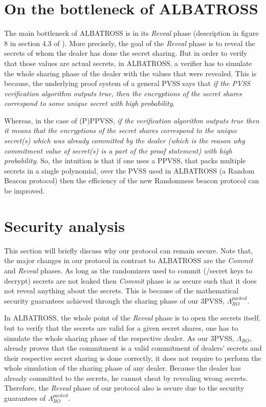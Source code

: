 \section{On the bottleneck of ALBATROSS}
The main bottleneck of ALBATROSS is in its \textit{Reveal} phase (description in 
figure 8 in section 4.3 of \cite{cryptoeprint:2020/644}). More precisely, the 
goal of the \textit{Reveal} phase is to reveal the secrets of whom the dealer has done the 
secret sharing. But in order to verify that those values are actual secrets, in ALBATROSS, a 
verifier has to simulate the whole sharing phase of the dealer with the values that were 
revealed. This is because, the underlying proof system of a general PVSS says that \textit{if the 
PVSS verification algorithm outputs true, then the encryptions of the secret shares correspond 
to some unique secret with high probability}.\par

Whereas, in the case of (P)PPVSS, \textit{if the verification algorithm outputs true then it means 
that the encryptions of the secret shares correspond to the unique secret(s) which was 
already committed by the dealer (which is the reason why commitment value of secret(s) 
is a part of the proof statement) with high probability}. So, the intuition is that if one 
uses a PPVSS, that packs multiple secrets in a single polynomial, over the PVSS used in 
ALBATROSS (a Random Beacon protocol) then the efficiency of the new Randomness beacon 
protocol can be improved.

\section{Security analysis}
This section will briefly discuss why our protocol can remain secure. Note that, the major changes 
in our protocol in contrast to ALBATROSS are the \textit{Commit} and \textit{Reveal} 
phases. As long as the randomizers used to commit (/secret keys to decrypt) secrets are 
not leaked then \textit{Commit} phase is as secure such that it does not reveal anything 
about the secrets. This is because of the mathematical security guarantees achieved 
through the sharing phase of our 3PVSS, $\Lambda_{RO}^{packed}$.\par

In ALBATROSS, the whole point of the \textit{Reveal} phase is to open the secrets itself, 
but to verify that the secrets are valid for a given secret shares, one has to simulate 
the whole sharing phase of the respective dealer. As our 3PVSS, $\Lambda_{RO}$, already 
proves that the commitment is a valid commitment of dealers' secrets and their respective 
secret sharing is done correctly, it does not require to perform the whole simulation of 
the sharing phase of any dealer. Because the dealer has already committed to the 
secrets, he cannot cheat by revealing wrong secrets. Therefore, the \textit{Reveal} 
phase of our protocol also is secure due to the security guarantees of $\Lambda_{RO}^{packed}$.

